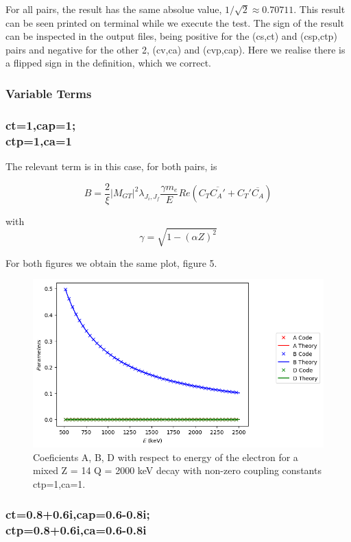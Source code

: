 \documentclass[twocolumn]{article}
\begin{document}
For all pairs, the result has the same absolue value, $1/\sqrt{2} \approx 0.70711$. This result can be seen printed on terminal while we execute the test. The sign of the result can be inspected in the output files, being positive for the (cs,ct) and (csp,ctp) pairs and negative for the other 2, (cv,ca) and (cvp,cap). Here we realise there is a flipped sign in the definition, which we correct.


\subsubsection{Variable Terms}

 \subsubsection*{ct=1,cap=1;\\ctp=1,ca=1}
 
 The relevant term is in this case, for both pairs, is
 
 $$B= \frac{2}{\xi}|M_{GT}|^2\lambda_{J_i,J_f}\frac{\gamma m_e}{E}Re(C_T\overline{C_A'}+C_T'\overline{C_A})$$
 
 with $$\gamma = \sqrt{1-(\alpha Z)^2}$$
 
 For both figures we obtain the same plot, figure 5.
 
 \begin{figure}
 	\centering
 	\includegraphics[width=\columnwidth]{plots/ctcap_real_mixed_result.png}
 	\caption{Coeficients A, B, D with respect to energy of the electron for a mixed Z = 14 Q = 2000 keV decay  with non-zero coupling constants ctp=1,ca=1.}
 \end{figure}
 
 \subsubsection*{ct=0.8+0.6i,cap=0.6-0.8i;\\ctp=0.8+0.6i,ca=0.6-0.8i}
 
\end{document}
